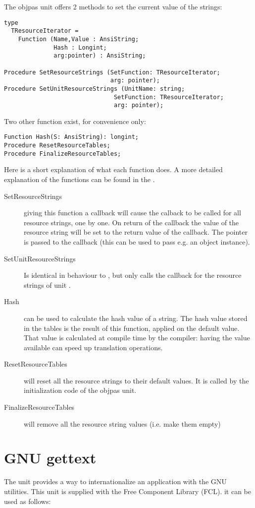 The objpas unit offers 2 methods to set the current value of the strings:
\begin{verbatim}
type
  TResourceIterator = 
    Function (Name,Value : AnsiString;  
              Hash : Longint; 
              arg:pointer) : AnsiString;

Procedure SetResourceStrings (SetFunction: TResourceIterator;
                              arg: pointer);
Procedure SetUnitResourceStrings (UnitName: string;
                               SetFunction: TResourceIterator;
                               arg: pointer);
\end{verbatim}
Two other function exist, for convenience only:
\begin{verbatim}
Function Hash(S: AnsiString): longint;
Procedure ResetResourceTables;
Procedure FinalizeResourceTables;
\end{verbatim}
Here is a short explanation of what each function does. A more detailed
explanation of the functions can be found in the .
\begin{description}
\item[SetResourceStrings] giving this function a callback will cause the
calback to be called for all resource strings, one by one. On return of the
callback the value of the resource string will be set to the return value 
of the callback. 
The  pointer is passed to the callback (this can be used to pass e.g. an object
instance).
\item[SetUnitResourceStrings] Is identical in behaviour to
, but only calls the callback for the resource
strings of unit .
\item [Hash] can be used to calculate the hash value of a string. The hash
value stored in the tables is the result of this function, applied on the
default value. That value is calculated at compile time by the compiler:
having the value available can speed up translation operations. 
\item[ResetResourceTables] will reset all the resource strings to their
default values. It is called by the initialization code of the objpas unit.
\item[FinalizeResourceTables] will remove all the resource string values
(i.e. make them empty)
\end{description}
\section{GNU gettext}
The unit  provides a way to internationalize an application
with the GNU  utilities. This unit is supplied with  the
Free Component Library (FCL). it can be used as follows:

